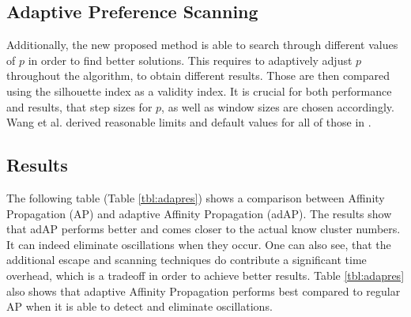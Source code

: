 \documentclass[11pt,a4paper]{article}
\begin{document}
\subsection{Adaptive Preference Scanning}
Additionally, the new proposed method is able to search through different values of $p$ in order to find better solutions. This requires to adaptively adjust $p$ throughout the algorithm, to obtain different results. Those are then compared using the silhouette index \cite{ROUSSEEUW198753} as a validity index. It is crucial for both performance and results, that step sizes for $p$, as well as window sizes are chosen accordingly. Wang et al. derived reasonable limits and default values for all of those in \cite{wang2008adaptive}.
\pagebreak
\subsection{Results}
The following table (Table \ref{tbl:adapres}) shows a comparison between Affinity Propagation (AP) and adaptive Affinity Propagation (adAP). The results show that adAP performs better and comes closer to the actual know cluster numbers. It can indeed eliminate oscillations when they occur. One can also see, that the additional escape and scanning techniques do contribute a significant time overhead, which is a tradeoff in order to achieve better results. Table \ref{tbl:adapres} also shows that adaptive Affinity Propagation performs best compared to regular AP when it is able to detect and eliminate oscillations.
\end{document}
